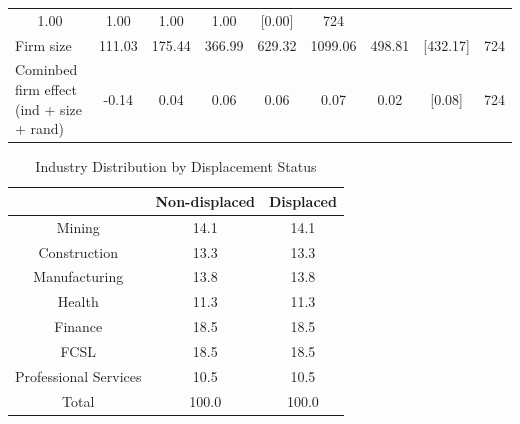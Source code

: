 \documentclass{article}
\begin{document}
\begin{table}[htbp]
\begin{threeparttable}
\begin{tabular}{lllllllll}
  \multicolumn{1}{c}{1.00} &
  \multicolumn{1}{c}{1.00} &
  \multicolumn{1}{c}{1.00} &
  \multicolumn{1}{c}{1.00} &
  \multicolumn{1}{c}{[0.00]} &
  \multicolumn{1}{c}{724} \\
\multicolumn{1}{l}{Firm size} &
  \multicolumn{1}{c}{111.03} &
  \multicolumn{1}{c}{175.44} &
  \multicolumn{1}{c}{366.99} &
  \multicolumn{1}{c}{629.32} &
  \multicolumn{1}{c}{1099.06} &
  \multicolumn{1}{c}{498.81} &
  \multicolumn{1}{c}{[432.17]} &
  \multicolumn{1}{c}{724} \\
\multicolumn{1}{l}{Cominbed firm effect (ind + size + rand)} &
  \multicolumn{1}{c}{-0.14} &
  \multicolumn{1}{c}{0.04} &
  \multicolumn{1}{c}{0.06} &
  \multicolumn{1}{c}{0.06} &
  \multicolumn{1}{c}{0.07} &
  \multicolumn{1}{c}{0.02} &
  \multicolumn{1}{c}{[0.08]} &
  \multicolumn{1}{c}{724} \\
\bottomrule
\end{tabular}

\end{threeparttable} 
\end{table}
\begin{table}[htbp] 
\centering 
\begin{threeparttable} 
\caption{Industry Distribution by Displacement Status} 

\centering
\begin{tabular}{lll}
\toprule
\multicolumn{1}{c}{} &
  \multicolumn{1}{c}{Non-displaced} &
  \multicolumn{1}{c}{Displaced} \\
\midrule
\multicolumn{1}{c}{Mining} &
  \multicolumn{1}{c}{14.1} &
  \multicolumn{1}{c}{14.1} \\
\multicolumn{1}{c}{Construction} &
  \multicolumn{1}{c}{13.3} &
  \multicolumn{1}{c}{13.3} \\
\multicolumn{1}{c}{Manufacturing} &
  \multicolumn{1}{c}{13.8} &
  \multicolumn{1}{c}{13.8} \\
\multicolumn{1}{c}{Health} &
  \multicolumn{1}{c}{11.3} &
  \multicolumn{1}{c}{11.3} \\
\multicolumn{1}{c}{Finance} &
  \multicolumn{1}{c}{18.5} &
  \multicolumn{1}{c}{18.5} \\
\multicolumn{1}{c}{FCSL} &
  \multicolumn{1}{c}{18.5} &
  \multicolumn{1}{c}{18.5} \\
\multicolumn{1}{c}{Professional Services} &
  \multicolumn{1}{c}{10.5} &
  \multicolumn{1}{c}{10.5} \\
\multicolumn{1}{c}{Total} &
  \multicolumn{1}{c}{100.0} &
  \multicolumn{1}{c}{100.0} \\
\bottomrule
\end{tabular}

\end{threeparttable} 
\end{table}
\end{document}
